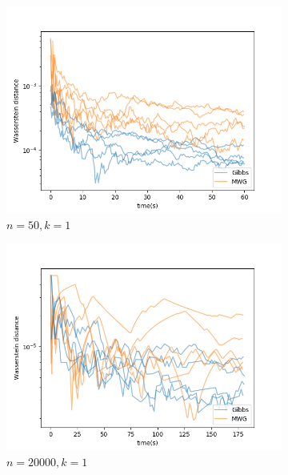 \begin{figure}[H]
    \centering
    \begin{subfigure}{0.3\linewidth}
    	\centering
        \includegraphics[width=\linewidth]{../../plots/KL_M2_N50_NMCMC1_seed0_diffind2.png}
        \caption{$n=50, k=1$}
    \end{subfigure}
    \begin{subfigure}{0.3\linewidth}
        \centering
    	\includegraphics[width=\linewidth]{../../plots/KL_M2_N20000_NMCMC3_seed0_diffind2.png}
    	\caption{$n=20000, k=1$}
    	\label{fig:wass_exception}
	\end{subfigure}
	\begin{subfigure}{0.3\linewidth}
	    \centering

\end{subfigure}
\end{figure}
